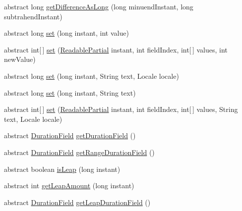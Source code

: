 \begin{DoxyCompactItemize}
\item 
abstract long \hyperlink{classorg_1_1joda_1_1time_1_1_date_time_field_a80010032bef4415ebab061dfb5097a85}{get\-Difference\-As\-Long} (long minuend\-Instant, long subtrahend\-Instant)
\item 
abstract long \hyperlink{classorg_1_1joda_1_1time_1_1_date_time_field_a1b5df9ceb6dc4a400e6d77b64ccf4c13}{set} (long instant, int value)
\item 
abstract int\mbox{[}$\,$\mbox{]} \hyperlink{classorg_1_1joda_1_1time_1_1_date_time_field_a60e478d7bcdbad49592e19d8f28d8ff1}{set} (\hyperlink{interfaceorg_1_1joda_1_1time_1_1_readable_partial}{Readable\-Partial} instant, int field\-Index, int\mbox{[}$\,$\mbox{]} values, int new\-Value)
\item 
abstract long \hyperlink{classorg_1_1joda_1_1time_1_1_date_time_field_a7a01323f42018a5e9ce381962cbf5da8}{set} (long instant, String text, Locale locale)
\item 
abstract long \hyperlink{classorg_1_1joda_1_1time_1_1_date_time_field_a7bd63c257c107462ac410ee9ee2c7ea9}{set} (long instant, String text)
\item 
abstract int\mbox{[}$\,$\mbox{]} \hyperlink{classorg_1_1joda_1_1time_1_1_date_time_field_a9008ec64f9779950962345732102867c}{set} (\hyperlink{interfaceorg_1_1joda_1_1time_1_1_readable_partial}{Readable\-Partial} instant, int field\-Index, int\mbox{[}$\,$\mbox{]} values, String text, Locale locale)
\item 
abstract \hyperlink{classorg_1_1joda_1_1time_1_1_duration_field}{Duration\-Field} \hyperlink{classorg_1_1joda_1_1time_1_1_date_time_field_a1a33e88267e8bb42ee30a47de3f055e8}{get\-Duration\-Field} ()
\item 
abstract \hyperlink{classorg_1_1joda_1_1time_1_1_duration_field}{Duration\-Field} \hyperlink{classorg_1_1joda_1_1time_1_1_date_time_field_a8231a5ed1afdfcb8be03565bdc92ca3f}{get\-Range\-Duration\-Field} ()
\item 
abstract boolean \hyperlink{classorg_1_1joda_1_1time_1_1_date_time_field_a94b6237848c3a662a5f5f2cb680546ca}{is\-Leap} (long instant)
\item 
abstract int \hyperlink{classorg_1_1joda_1_1time_1_1_date_time_field_abafa23cc2e495b7f01c08de5df9d5d20}{get\-Leap\-Amount} (long instant)
\item 
abstract \hyperlink{classorg_1_1joda_1_1time_1_1_duration_field}{Duration\-Field} \hyperlink{classorg_1_1joda_1_1time_1_1_date_time_field_a70c3fdbed8533c99ab1d468170215a0a}{get\-Leap\-Duration\-Field} ()
\item 

\end{DoxyCompactItemize}
